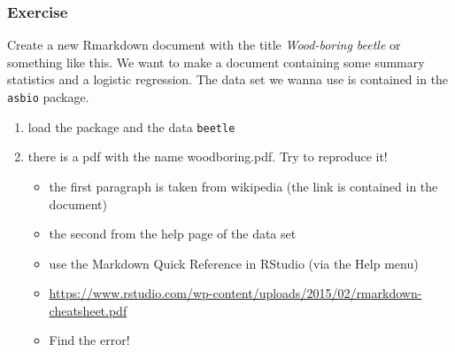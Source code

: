 \begin{frame}[fragile]\frametitle{Exercise}
  Create a new Rmarkdown document with the title \emph{Wood-boring beetle} or something like this. We want to make a document containing some summary statistics and a logistic regression. The data set we wanna use is contained in the \texttt{asbio} package.
  \begin{enumerate}
  \item load the package and the data \texttt{beetle}
  \item there is a pdf with the name woodboring.pdf. Try to reproduce it!
    \begin{itemize}
    \item the first paragraph is taken from wikipedia (the link is contained in the document)
    \item the second from the help page of the data set
    \item use the Markdown Quick Reference in RStudio (via the Help menu)
    \item \url{https://www.rstudio.com/wp-content/uploads/2015/02/rmarkdown-cheatsheet.pdf}
    \item Find the error!
    \end{itemize}
  \end{enumerate}
\end{frame}


